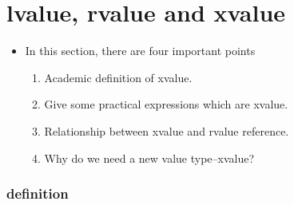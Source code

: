 \documentclass[a4paper,12pt,twoside]{book}
\begin{document}
\section{lvalue, rvalue and xvalue}
\begin{itemize}
	\item In this section, there are four important points
	\begin{enumerate}
		\item Academic definition of xvalue.
		\item Give some practical expressions which are xvalue.
		\item Relationship between xvalue and rvalue reference.
		\item Why do we need a new value type--xvalue?
	\end{enumerate}
	
\end{itemize}

\subsubsection{definition}
\end{document}
